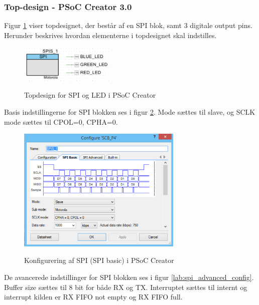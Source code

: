 
\subsubsection*{Top-design - PSoC Creator 3.0}

Figur \ref{lab:topdesign_spi} viser topdesignet, der består af en SPI blok, samt 3 digitale output pins. Herunder beskrives hvordan elementerne i topdesignet skal indstilles.

\begin{figure}[H] \centering
{\includegraphics[width=0.4\textwidth]{filer/implementering/spi/spi_handler_topdesign}}
\caption{Topdesign for SPI og LED i PSoC Creator}
\label{lab:topdesign_spi}
\raggedright
\end{figure}

Basis indstillingerne for SPI blokken ses i figur \ref{lab:spi_basic_config}. Mode sættes til slave, og SCLK mode sættes til CPOL=0, CPHA=0.

\begin{figure}[H] \centering
{\includegraphics[width=0.7\textwidth]{filer/implementering/spi/spi_handler_topdesign_spi_basic}}
\caption{Konfigurering af SPI (SPI basic) i PSoC Creator}
\label{lab:spi_basic_config}
\raggedright
\end{figure}

De avancerede indstillinger for SPI blokken ses i figur \ref{lab:spi_advanced_config}. Buffer size sættes til 8 bit for både RX og TX. Interruptet sættes til internt og interrupt kilden er RX FIFO not empty og RX FIFO full.


